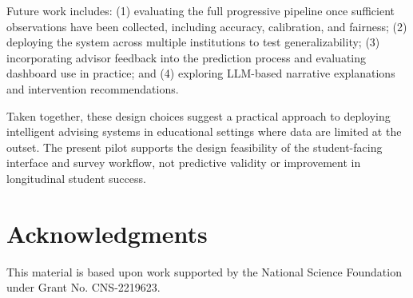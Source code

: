 \documentclass[letterpaper,11pt]{article}
\begin{document}
Future work includes: (1) evaluating the full progressive pipeline once sufficient observations have been collected, including accuracy, calibration, and fairness; (2) deploying the system across multiple institutions to test generalizability; (3) incorporating advisor feedback into the prediction process and evaluating dashboard use in practice; and (4) exploring LLM-based narrative explanations and intervention recommendations.

Taken together, these design choices suggest a practical approach to deploying intelligent advising systems in educational settings where data are limited at the outset. The present pilot supports the design feasibility of the student-facing interface and survey workflow, not predictive validity or improvement in longitudinal student success.


\section{Acknowledgments}
\small

This material is based upon work supported by the National Science Foundation under Grant No. CNS-2219623.

\begin{sloppypar}
\printbibliography[title={REFERENCES}]
\end{sloppypar}
\end{document}
